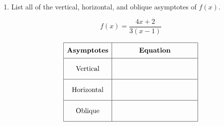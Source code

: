 \documentclass[11pt]{article}
\begin{document}
\begin{enumerate}
{\begin{enumerate}
{{\[\text{Range: } (-\infty, \infty)\]

range: \(\boxed{ (-\infty, \infty) }\)

}
}

\item
{}

\end{enumerate}
}

\newpage

% 

\item %
\providecommand{\stxKnowl}{}\renewcommand{\stxKnowl}[1]{#1}
\providecommand{\stxOuttro}{}\renewcommand{\stxOuttro}[1]{#1}
\providecommand{\stxTitle}{}\renewcommand{\stxTitle}[1]{#1}
\renewcommand{\stxOuttro}[1]{}
\stxKnowl{
List all of the vertical, horizontal, and oblique asymptotes of \(f(x)\).

\[f(x) = \frac{4x + 2}{3(x - 1)}\]

 \[\begin{array}{|c|c|} \hline \rule[-0.8em]{0pt}{2.2em} \textbf{Asymptotes} & \textbf{Equation} \\ \hline \rule[-1.2em]{0pt}{3em} \text{Vertical} & \text{\hspace{4cm}} \\ \hline \rule[-1.2em]{0pt}{3em} \text{Horizontal} & \text{\hspace{4cm}} \\ \hline \rule[-1.2em]{0pt}{3em} \text{Oblique} & \text{\hspace{4cm}} \\ \hline \end{array}\] 

\stxOuttro{
Solution

 \[\begin{array}{|c|c|} \hline \rule[-0.8em]{0pt}{2.2em} \textbf{Asymptotes} & \textbf{Equation} \\ \hline \rule[-1.2em]{0pt}{3em} \text{Vertical} & x = 1 \\ \hline \rule[-1.2em]{0pt}{3em} \text{Horizontal} & y = 4 \\ \hline \rule[-1.2em]{0pt}{3em} \text{Oblique} & \text{none} \\ \hline \end{array}\] 

}}
\end{enumerate}
\end{document}
